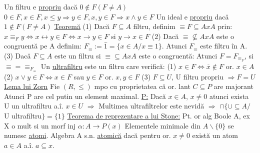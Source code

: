 \documentclass[8pt,twocolumn]{extarticle}
\begin{document}
	Un filtru e \underline{propriu} dacă $0 \notin F (F \neq A)$ \newline
	$0 \in F, x \in F, x \leq y \Rightarrow y \in F, x, y \in F \Rightarrow x \wedge y \in F$ \newline
	Un ideal e \underline{propriu} dacă $1 \notin F(F \neq A)$ \newline
	\underline{Teoremă} \newline
	(1) Dacă $F \subseteq A$ filtru, definim $\equiv F \subseteq A x A$ prin: \newline
	$x \equiv _{F} y \Leftrightarrow x \leftrightarrow y \in F \Leftrightarrow x \rightarrow y \in F$ si $y \rightarrow x \in F$ \newline
	(2) Dacă $\equiv \not\subseteq A x A$ este o congruentă pe A definim: \newline
	$F_{\equiv} := \hat{1} = \{x \in A / x \equiv 1\}$. Atunci $F_{\equiv}$ este filtru în A. \newline
	(3) Dacă $F \subseteq A$ este un filtru si $\equiv \subseteq A x A$ este o congruentă: \newline
	Atunci $F = F_{\equiv _{F}}$, si $\equiv = \equiv _{F_{\equiv}}$ \newline
	Un \underline{ultrafiltru} este un filtru care verifică: \newline
	(1) $x \in F \Leftrightarrow \overline{x} \notin F$ or. $x \in A$ \newline
	(2) $x \vee y \in F \Leftrightarrow x \in F$ sau $y \in F$ or. $x, y \in F$ \newline
	(3) $F \subseteq U$, U filtru propriu $\Rightarrow F = U$ \newline
	\underline{Lema lui Zorn} \newline
	Fie $(R, \leq)$ mpo cu proprietatea că or. lant $C \subseteq P$ are majorant \newline
	Atunci P are cel putin un element maximal. \newline
	\underline{P:} Dacă $x \in A$, $x \neq 0$ atunci exista U un ultrafiltru a.î. $x \in U$ \newline
	$\Rightarrow$ Multimea ultrafiltrelor este nevidă \newline
	$\Rightarrow$ $\cap \{ \cup \subseteq A / $ U ultrafiltru$\} = \{ 1\}$ \newline
	\underline{Teorema de reprezentare a lui Stone:} \newline
	Pt. or alg Boole A, ex X o mult si un morf inj $\alpha : A \rightarrow P(x)$ \newline
	Elementele minimale din $A \backslash \{ 0 \}$ se numesc \underline{atomi}. Algebra A s.n. \underline{atomică} dacă pentru or. $x \neq 0$ există un atom $a \in A$ a.î. $a \subseteq x$.
\end{document}
